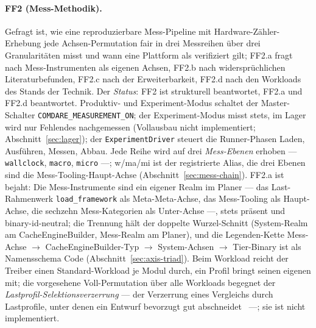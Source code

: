 \begin{nurkurz}
\paragraph{FF2 (Mess-Methodik).} Gefragt ist, wie eine reproduzierbare Mess-Pipeline mit
Hardware-Zähler-Erhebung jede Achsen-Permutation fair in drei Messreihen über drei Granularitäten misst und
wann eine Plattform als verifiziert gilt; FF2.a fragt nach Mess-Instrumenten als eigenen Achsen, FF2.b nach
widersprüchlichen Literaturbefunden, FF2.c nach der Erweiterbarkeit, FF2.d nach den Workloads des Stands der
Technik. Der \emph{Status}: FF2 ist strukturell beantwortet, FF2.a und FF2.d beantwortet. Produktiv- und
Experiment-Modus schaltet der Master-Schalter \texttt{COMDARE\_\allowbreak{}MEASUREMENT\_\allowbreak{}ON};
der
Experiment-Modus misst stets, im Lager wird nur Fehlendes nachgemessen (Vollausbau nicht implementiert;
Abschnitt~\ref{sec:lager}); der \texttt{ExperimentDriver} steuert die Runner-Phasen Laden, Ausführen,
Messen,
Abbau. Jede Reihe wird auf drei \emph{Mess-Ebenen} erhoben --- \texttt{wallclock}, \texttt{macro},
\texttt{micro} ---; w/ma/mi ist der registrierte Alias, die drei Ebenen sind die Mess-Tooling-Haupt-Achse
(Abschnitt~\ref{sec:mess-chain}). FF2.a ist bejaht:
Die Mess-Instrumente sind ein eigener Realm im Planer --- das Last-Rahmenwerk \texttt{load\_framework} als
Meta-Meta-Achse, das Mess-Tooling als Haupt-Achse, die sechzehn Mess-Kategorien als Unter-Achse ---,
stets präsent und binary-id-neutral; die Trennung hält der doppelte Wurzel-Schnitt
(System-Realm am CacheEngineBuilder, Mess-Realm am Planer), und die Legenden-Kette Mess-Achse $\to$
CacheEngineBuilder-Typ $\to$ System-Achsen $\to$ Tier-Binary ist als Namensschema Code
(Abschnitt~\ref{sec:axis-triad}). Beim Workload reicht der Treiber einen Standard-Workload je Modul durch,
ein Profil bringt seinen eigenen mit; die vorgesehene Voll-Permutation über alle Workloads begegnet der
\emph{Lastprofil-Selektionsverzerrung} --- der Verzerrung eines Vergleichs durch Lastprofile, unter denen
ein
Entwurf bevorzugt gut abschneidet~\cite{blackburn2006dacapo,blackburn2016truth,mytkowicz2009wrongdata} ---;
sie ist nicht implementiert.
\end{nurkurz}

